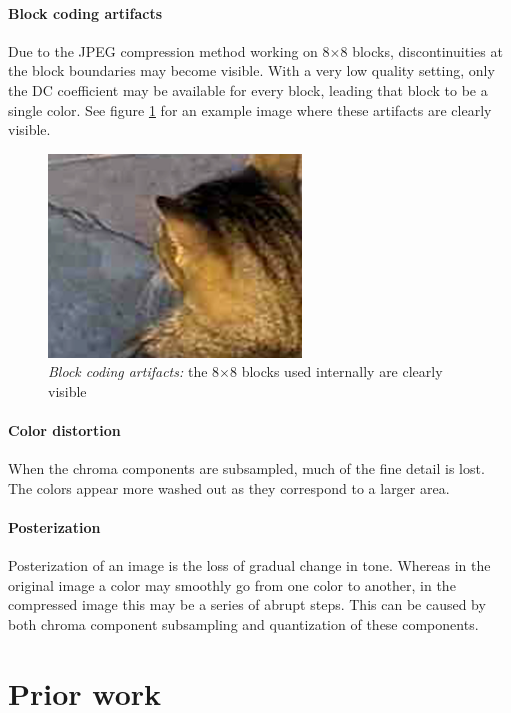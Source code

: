 \paragraph{Block coding artifacts}
Due to the JPEG compression method working on 8$\times$8 blocks, discontinuities at the block boundaries may become visible. With a very low quality setting, only the DC coefficient may be available for every block, leading that block to be a single color. See figure \ref{fig:bc} for an example image where these artifacts are clearly visible.


\begin{figure}[ht]
    \centering
        \includegraphics[width=0.6\textwidth]{../graphics/blocking.png}
    \caption[Short caption to special figure]{\textit{Block coding artifacts:} the 8$\times$8 blocks used internally are clearly visible}
    \label{fig:bc}
\end{figure}



\paragraph{Color distortion}
When the chroma components are subsampled, much of the fine detail is lost. The colors appear more washed out as they correspond to a larger area.

\paragraph{Posterization}
Posterization of an image is the loss of gradual change in tone. Whereas in the original image a color may smoothly go from one color to another, in the compressed image this may be a series of abrupt steps. This can be caused by both chroma component subsampling and quantization of these components. 


\section{Prior work}

